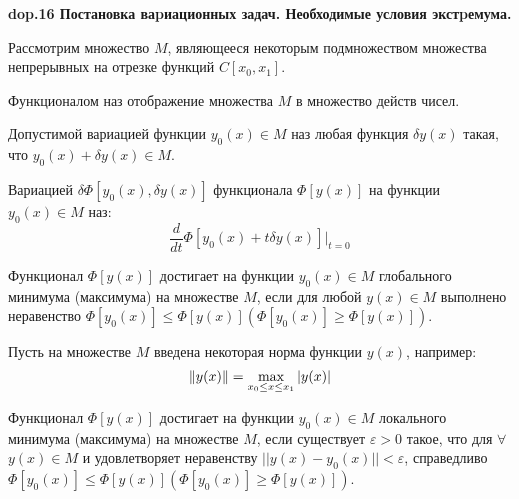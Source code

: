 \setcounter{section}{4}
\setcounter{subsection}{16}
\setcounter{equation}{0}
\textbf{\LARGE dop.16 Постановка ваpиационных задач. Необходимые условия экстpемума.}

Рассмотрим множество $M$, являющееся некоторым подмножеством
множества непрерывных на отрезке функций $C[x_0, x_1]$.

\begin{definition}
    Функционалом наз отображение множества $M$ в множество действ чисел.
\end{definition}

\begin{definition}
    Допустимой вариацией функции $y_0(x) \in M$ наз любая функция $\delta y(x)$ такая, что $y_0(x) + \delta y(x) \in M$.
\end{definition}

\begin{definition}
    Вариацией $\delta\Phi[y_0(x), \delta y(x)]$ функционала
    $\Phi[y(x)]$ на функции $y_0(x) \in M$ наз: $$\frac{d}{dt}\Phi[y_0(x)+t\delta y(x)]\Big|_{t=0}$$
\end{definition}

\begin{definition}
    Функционал $\Phi[y(x)]$ достигает на функции
    $y_0(x) \in M$ глобального минимума (максимума) на множестве $M$, если для любой $y(x) \in M$ выполнено неравенство $\Phi[y_0(x)]\leq\Phi[y(x)]  (\Phi[y_0(x)]\geq\Phi[y(x)])$.
\end{definition}

Пусть на множестве $M$ введена некоторая норма функции $y(x)$, например:
$$\|y(x)\|=\displaystyle\max_{x_0\leq x \leq x_1} |y(x)|$$

\begin{definition}
    Функционал $\Phi[y(x)]$ достигает на функции
    $y_0(x)\in M$ локального минимума (максимума) на множестве $M$, если
    существует $\varepsilon > 0$ такое, что для $\forall$ $y(x) \in M$ и удовлетворяет неравенству $||y(x) - y_0(x)|| < \varepsilon$, справедливо $\Phi[y_0(x)] \leq \Phi[y(x)] (\Phi[y_0(x)] \geq \Phi[y(x)])$.
\end{definition}

